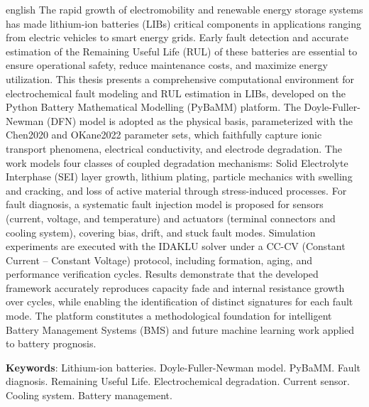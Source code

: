 \documentclass[
    12pt,
    openright,
    twoside,
    a4paper,
    brazil,
    english
]{abntex2}
\begin{document}
\begin{resumo}[Abstract]
  \begin{otherlanguage*}{english}
    The rapid growth of electromobility and renewable energy storage systems has
    made lithium-ion batteries (LIBs) critical components in applications ranging
    from electric vehicles to smart energy grids. Early fault detection and
    accurate estimation of the Remaining Useful Life (RUL) of these batteries are
    essential to ensure operational safety, reduce maintenance costs, and maximize
    energy utilization. This thesis presents a comprehensive computational
    environment for electrochemical fault modeling and RUL estimation in LIBs,
    developed on the Python Battery Mathematical Modelling (PyBaMM) platform. The
    Doyle-Fuller-Newman (DFN) model is adopted as the physical basis,
    parameterized with the Chen2020 and OKane2022 parameter sets, which faithfully
    capture ionic transport phenomena, electrical conductivity, and electrode
    degradation. The work models four classes of coupled degradation mechanisms:
    Solid Electrolyte Interphase (SEI) layer growth, lithium plating, particle
    mechanics with swelling and cracking, and loss of active material through
    stress-induced processes. For fault diagnosis, a systematic fault injection
    model is proposed for sensors (current, voltage, and temperature) and actuators
    (terminal connectors and cooling system), covering bias, drift, and stuck fault
    modes. Simulation experiments are executed with the IDAKLU solver under a
    CC-CV (Constant Current -- Constant Voltage) protocol, including formation,
    aging, and performance verification cycles. Results demonstrate that the
    developed framework accurately reproduces capacity fade and internal resistance
    growth over cycles, while enabling the identification of distinct signatures
    for each fault mode. The platform constitutes a methodological foundation for
    intelligent Battery Management Systems (BMS) and future machine learning work
    applied to battery prognosis.

    \textbf{Keywords}: Lithium-ion batteries. Doyle-Fuller-Newman model.
    PyBaMM. Fault diagnosis. Remaining Useful Life. Electrochemical degradation.
    Current sensor. Cooling system. Battery management.
  \end{otherlanguage*}
\end{resumo}

\listoffigures*
\cleardoublepage
\end{document}
